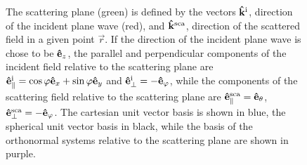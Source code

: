 \begin{figure}[h!]
%
\caption[Scattering plane unit vector systems]{The scattering plane (green) is defined by the vectors $\vu{k}^\text{i}$, direction of the incident plane wave (red), and $\vu{k}^\text{sca}$, direction of the scattered field in a given point $\vec{r}$. If the direction of the incident plane wave is chose to be $\vu{e}_z$, the parallel and perpendicular components of the incident field relative to the scattering plane are $\vu{e}_\parallel^\text{i} = \cos\varphi\vu{e}_x +\sin\varphi\vu{e}_y$ and  $\vu{e}_\perp^\text{i} = -\vu{e}_\varphi$, while the components of the scattering field relative to the scattering plane are $\vu{e}_\parallel^\text{sca} = \vu{e}_\theta$, $\vu{e}_\perp^\text{sca} = - \vu{e}_\varphi$. The cartesian unit vector basis is shown in blue, the spherical unit vector basis in black, while the basis of the orthonormal systems relative to the scattering plane are shown in purple. }
\label{fig:ScatPlane}
	\end{figure}

